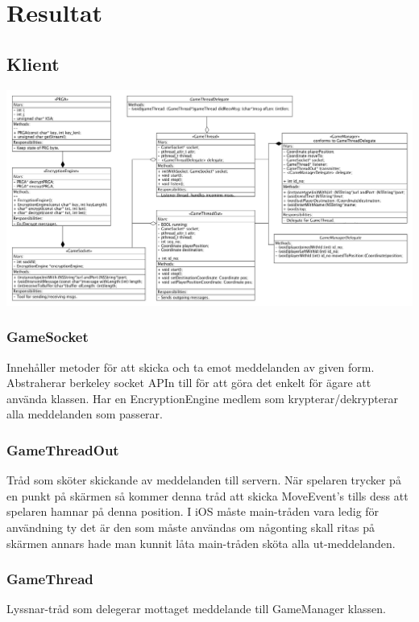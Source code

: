\documentclass[10pt, titlepage, oneside, a4paper]{article}
\begin{document}
	\newpage
	\section{Resultat}%
		\subsection{Klient}
		\begin{center}
			\includegraphics[scale=.2]{./png/ClientClassDiagram.png}			
		\end{center}
		\subsubsection{GameSocket}
		Innehåller metoder för att skicka och ta emot meddelanden av given form. Abstraherar berkeley socket APIn till för att göra det enkelt för ägare att använda klassen. Har en EncryptionEngine medlem som krypterar/dekrypterar alla meddelanden som passerar.
		\subsubsection{GameThreadOut}
		Tråd som sköter skickande av meddelanden till servern. När spelaren trycker på en punkt på skärmen så kommer denna tråd att skicka MoveEvent's tills dess att spelaren hamnar på denna position. I iOS måste main-tråden vara ledig för användning ty det är den som måste användas om någonting skall ritas på skärmen annars hade man kunnit låta main-tråden sköta alla ut-meddelanden.
		
		\newpage
		\subsubsection{GameThread}
		Lyssnar-tråd som delegerar mottaget meddelande till GameManager klassen.
\end{document}
